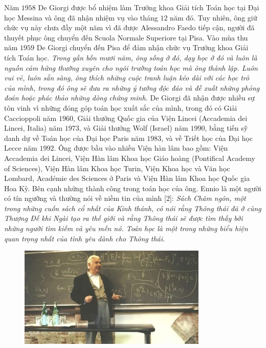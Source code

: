 \begin{multicols}{2}
	\vskip 0.1cm
	Năm $1958$ De Giorgi được bổ nhiệm làm Trưởng khoa Giải tích Toán học tại Đại học Messina và ông đã nhận nhiệm vụ vào tháng $12$ năm đó. Tuy nhiên, ông giữ chức vụ này chưa đầy một năm vì đã được Alessandro Faedo tiếp cận, người đã thuyết phục ông chuyển đến Scuola Normale Superiore tại Pisa. Vào mùa thu năm $1959$ De Giorgi chuyển đến Pisa để đảm nhận chức vụ Trưởng khoa Giải tích Toán học.
	\vskip 0.1cm
	\textit{Trong gần bốn mươi năm, ông sống ở đó, dạy học ở đó và luôn là nguồn cảm hứng thường xuyên cho ngôi trường toán học mà ông thành lập. Luôn vui vẻ, luôn sẵn sàng, ông thích những cuộc tranh luận kéo dài với các học trò của mình, trong đó ông sẽ đưa ra những ý tưởng độc đáo và đề xuất những phỏng đoán hoặc phác thảo những dòng chứng minh.}
	\vskip 0.05cm
	De Giorgi đã nhận được nhiều sự tôn vinh vì những đóng góp toán học xuất sắc của mình, trong đó có Giải Caccioppoli năm $1960$, Giải thưởng Quốc gia của Viện Lincei (Accademia dei Lincei, Italia) năm $1973$, và Giải thưởng Wolf (Israel) năm $1990$, bằng tiến sỹ danh dự về Toán học của Đại học Paris năm $1983$, và về Triết học của Đại học Lecce năm $1992$. Ông được bầu vào nhiều Viện hàn lâm bao gồm:  Viện Accademia dei Lincei, Viện Hàn lâm Khoa học Giáo hoàng (Pontifical Academy of Sciences), Viện Hàn lâm Khoa học Turin, Viện Khoa học và Văn học Lombard, Académie des Sciences ở Paris và Viện Hàn lâm Khoa học Quốc gia Hoa Kỳ.
	\vskip 0.1cm
	Bên cạnh những thành công trong toán học của ông. Ennio là một người có tín ngưỡng và thường nói về niềm tin của mình [$2$]:
	\vskip 0.1cm
	\textit{Sách Châm ngôn, một trong những cuốn sách cổ nhất của Kinh thánh,  có nói rằng Thông thái đã ở cùng Thượng Đế khi Ngài tạo ra thế giới và rằng Thông thái sẽ được tìm thấy bởi những người tìm kiếm và yêu mến nó. Toán học là một trong những biểu hiện quan trọng nhất của tình yêu dành cho Thông thái.}
	\begin{figure}[H]
			\vspace*{-5pt}
			\centering
			\captionsetup{labelformat= empty, justification=centering}
			\includegraphics[width= 1\linewidth]{3}

\end{figure}
\end{multicols}
